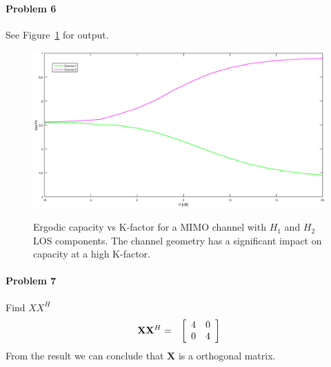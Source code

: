 \documentclass[12pt]{article}
\begin{document}
\paragraph{Problem 6}

See Figure~\ref{fig:mimoRic2} for output.
\begin{figure}
    \centering
  \includegraphics[width=6.0in]{mimoRic2.eps}\\
  \caption{Ergodic capacity vs K-factor for a MIMO channel with $H_1$ and $H_2$ LOS components.
The channel geometry has a significant impact on capacity at a high K-factor.}\label{fig:mimoRic2}
\end{figure}
\paragraph{Problem 7}
Find $XX^H$
\begin{eqnarray*}
{\bf X}{\bf X}^H &=& \left[
\begin{array}{cccc}
4 & 0 \\
0 & 4
\end{array}
\right]
\end{eqnarray*}
From the result we can conclude that {\bf X} is a orthogonal matrix.
\end{document}
